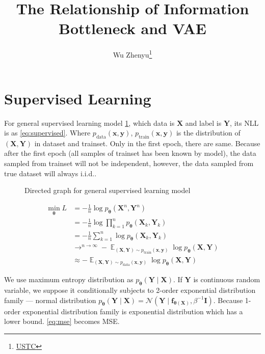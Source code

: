 \documentclass{article}
\title{The Relationship of Information Bottleneck and VAE}
\author{Wu Zhenyu\thanks{\href{https://ustc.edu.cn/}{USTC}}}
\begin{document}
\maketitle

\section{Supervised Learning}

For general supervised learning model \cref{fig:supervised}, which data is $\bm{X}$ and label is $\bm{Y}$, its
NLL is as \cref{eq:supervised}. Where $p_\mathrm{data}(\bm{x}, \bm{y})$,
$p_\mathrm{train}(\bm{x}, \bm{y})$ is the distribution of $(\bm{X}, \bm{Y})$ in
dataset and trainset. Only in the first epoch, there are same. Because after the
first epoch (all samples of trainset has been known by model), the data sampled from
trainset will not be independent, however, the data sampled from true dataset
will always i.i.d..

\begin{figure}[htpb]
  \centering
  
  \caption{Directed graph for general supervised learning model}%
  \label{fig:supervised}
\end{figure}

\begin{align}
  \label{eq:supervised}
  \min_{\bm{\theta}} L
  & = -\frac1n\log p_{\bm{\theta}}(\bm{X}^n, \bm{Y}^n)\\
  & = -\frac1n\log\prod_{k = 1}^n p_{\bm{\theta}}(\bm{X}_k, \bm{Y}_k)\\
  & = -\frac1n\sum_{k = 1}^n\log p_{\bm{\theta}}(\bm{X}_k, \bm{Y}_k)\\
  & \mathop{\longrightarrow}^{n \rightarrow \infty}
  -\mathop{\mathbb{E}}_{(\bm{X}, \bm{Y}) \sim p_\mathrm{train}(\bm{x}, \bm{y})}
  \log p_{\bm{\theta}}(\bm{X}, \bm{Y})\\
  & \approx -\mathop{\mathbb{E}}_{(\bm{X}, \bm{Y}) \sim
  p_\mathrm{data}(\bm{x}, \bm{y})}\log p_{\bm{\theta}}(\bm{X}, \bm{Y})
\end{align}

We use maximum entropy distribution as $p_{\bm{\theta}}(\bm{Y}\mid\bm{X})$. If
$\bm{Y}$ is continuous random variable, we suppose it conditionally subjects to
2-order exponential distribution family --- normal distribution
$p_{\bm{\theta}}(\bm{Y}\mid\bm{X}) =
\mathcal{N}(\bm{Y}\mid\bm{f}_{\bm{\theta}(\bm{X})}, \beta^{-1}\bm{I})$.
Because 1-order exponential distribution family is exponential distribution
which has a lower bound. \cref{eq:mse} becomes MSE{}.
\end{document}
